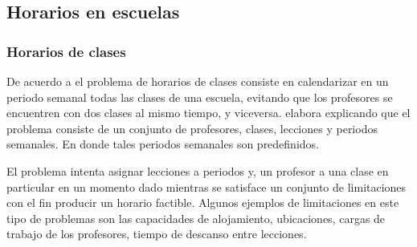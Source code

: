 \documentclass[draft,12pt,headsepline,footsepline,paper=letter]{scrreprt}
\begin{document}
\subsection{Horarios en escuelas}


\subsubsection{Horarios de clases}

De acuerdo a \citet[p.~88]{schaerf99a-survey-of-automated} el problema de horarios de clases consiste en calendarizar en un periodo semanal todas las clases de una escuela, evitando que los profesores se encuentren con dos clases al mismo tiempo, y viceversa. \citet[p.~10,11]{abdullah06heuristic-approaches} elabora explicando que el problema consiste de un conjunto de profesores, clases, lecciones y periodos semanales. En donde tales periodos semanales son predefinidos.

El problema intenta asignar lecciones a periodos y, un profesor a una clase en particular en un momento dado mientras se satisface un conjunto de limitaciones con el fin producir un horario factible. Algunos ejemplos de limitaciones en este tipo de problemas son las capacidades de alojamiento, ubicaciones, cargas de trabajo de los profesores, tiempo de descanso entre lecciones.

\end{document}
